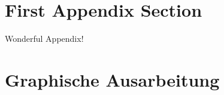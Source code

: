 \section{First Appendix Section}
Wonderful Appendix!
\section{\textbf{Graphische Ausarbeitung}}
\lipsum[1-5]
